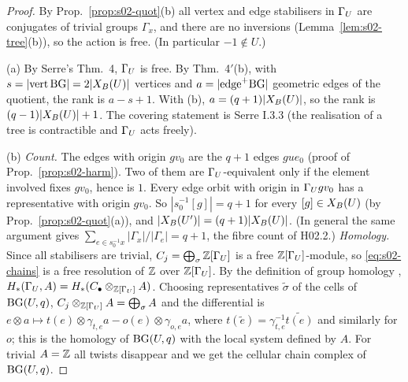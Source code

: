 \begin{proof}
By Prop.~\ref{prop:s02-quot}(b) all vertex and edge stabilisers in $\Gamma_U$ are conjugates of trivial groups $\Gamma_x$, and there are no inversions
(Lemma~\ref{lem:s02-tree}(b)), so the action is free. (In particular $-1\notin U$.)

(a) By Serre's Thm.~4, $\Gamma_U$ is free. By Thm.~4$'$(b), with $s=|\mathrm{vert}\,\mathrm{BG}|=2|X_B(U)|$ vertices and $a=|\mathrm{edge}^+\mathrm{BG}|$ geometric edges of the quotient,
the rank is $a-s+1$. With (b), $a=(q+1)|X_B(U)|$, so the rank is $(q-1)|X_B(U)|+1$. The covering statement is Serre I.3.3 (the realisation of a tree is
contractible and $\Gamma_U$ acts freely).

(b) \emph{Count.} The edges with origin $gv_0$ are the $q+1$ edges $gue_0$ (proof of Prop.~\ref{prop:s02-harm}). Two of them are $\Gamma_U$-equivalent only if the
element involved fixes $gv_0$, hence is $1$. Every edge orbit with origin in $\Gamma_U gv_0$ has a representative with origin $gv_0$. So $|s_0^{-1}[g]|=q+1$ for every
$[g]\in X_B(U)$ (by Prop.~\ref{prop:s02-quot}(a)), and $|X_B(U')|=(q+1)|X_B(U)|$. (In general the same argument gives $\sum_{e\in s_0^{-1}x}|\Gamma_x|/|\Gamma_e|=q+1$, the
fibre count of H02.2.)
\emph{Homology.} Since all stabilisers are trivial, $C_j=\bigoplus_\sigma\mathbb{Z}[\Gamma_U]$ is a free $\mathbb{Z}[\Gamma_U]$-module, so \eqref{eq:s02-chains} is a free resolution of $\mathbb{Z}$
over $\mathbb{Z}[\Gamma_U]$. By the definition of group homology ,
$H_*(\Gamma_U,A)=H_*(C_\bullet\otimes_{\mathbb{Z}[\Gamma_U]}A)$. Choosing representatives $\tilde\sigma$ of the cells of $\mathrm{BG}(U,q)$, $C_j\otimes_{\mathbb{Z}[\Gamma_U]}A=\bigoplus_\sigma A$ and the differential
is $e\otimes a\mapsto t(e)\otimes\gamma_{t,e}a-o(e)\otimes\gamma_{o,e}a$, where $t(\tilde e)=\gamma_{t,e}^{-1}\widetilde{t(e)}$ and similarly for $o$; this is the
homology of $\mathrm{BG}(U,q)$ with the local system defined by $A$. For trivial $A=\mathbb{Z}$ all twists disappear and we get the cellular chain complex of $\mathrm{BG}(U,q)$.
\end{proof}

